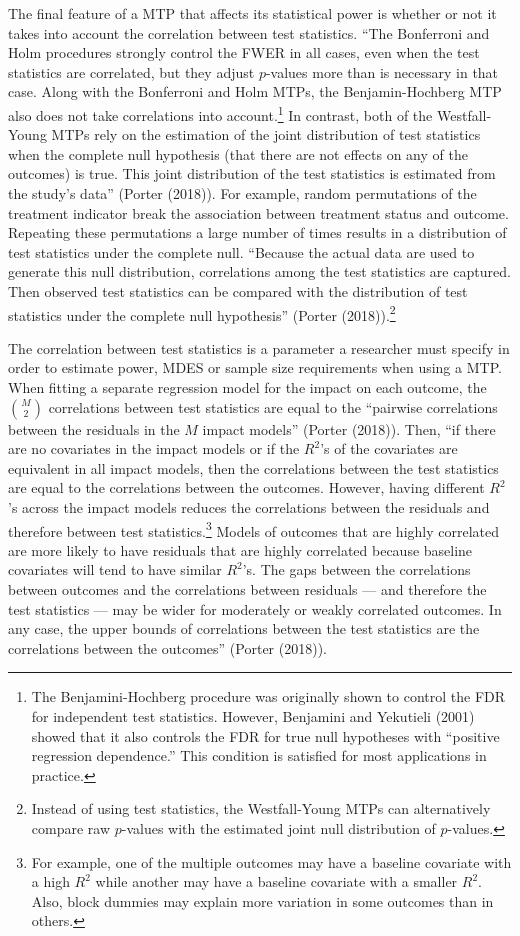 \documentclass[
]{article}
\begin{document}
The final feature of a MTP that affects its statistical power is whether
or not it takes into account the correlation between test statistics.
``The Bonferroni and Holm procedures strongly control the FWER in all
cases, even when the test statistics are correlated, but they adjust
\(p\)-values more than is necessary in that case. Along with the
Bonferroni and Holm MTPs, the Benjamin-Hochberg MTP also does not take
correlations into account.\footnote{The Benjamini-Hochberg procedure was
  originally shown to control the FDR for independent test statistics.
  However, Benjamini and Yekutieli (2001) showed that it also controls
  the FDR for true null hypotheses with ``positive regression
  dependence.'' This condition is satisfied for most applications in
  practice.} In contrast, both of the Westfall-Young MTPs rely on the
estimation of the joint distribution of test statistics when the
complete null hypothesis (that there are not effects on any of the
outcomes) is true. This joint distribution of the test statistics is
estimated from the study's data'' (Porter (2018)). For example, random
permutations of the treatment indicator break the association between
treatment status and outcome. Repeating these permutations a large
number of times results in a distribution of test statistics under the
complete null. ``Because the actual data are used to generate this null
distribution, correlations among the test statistics are captured. Then
observed test statistics can be compared with the distribution of test
statistics under the complete null hypothesis'' (Porter
(2018)).\footnote{Instead of using test statistics, the Westfall-Young
  MTPs can alternatively compare raw \(p\)-values with the estimated
  joint null distribution of \(p\)-values.}

The correlation between test statistics is a parameter a researcher must
specify in order to estimate power, MDES or sample size requirements
when using a MTP. When fitting a separate regression model for the
impact on each outcome, the \(\binom{M}{2}\) correlations between test
statistics are equal to the ``pairwise correlations between the
residuals in the \(M\) impact models'' (Porter (2018)). Then, ``if there
are no covariates in the impact models or if the \(R^2\)'s of the
covariates are equivalent in all impact models, then the correlations
between the test statistics are equal to the correlations between the
outcomes. However, having different \(R^2\)'s across the impact models
reduces the correlations between the residuals and therefore between
test statistics.\footnote{For example, one of the multiple outcomes may
  have a baseline covariate with a high \(R^2\) while another may have a
  baseline covariate with a smaller \(R^2\). Also, block dummies may
  explain more variation in some outcomes than in others.} Models of
outcomes that are highly correlated are more likely to have residuals
that are highly correlated because baseline covariates will tend to have
similar \(R^2\)'s. The gaps between the correlations between outcomes
and the correlations between residuals --- and therefore the test
statistics --- may be wider for moderately or weakly correlated
outcomes. In any case, the upper bounds of correlations between the test
statistics are the correlations between the outcomes'' (Porter (2018)).
\end{document}
